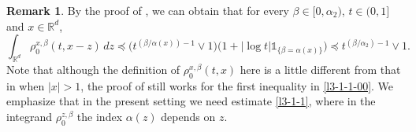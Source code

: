 \documentclass[a4paper,11pt]{amsart}
\newcommand{\R}{\mathds R}
\newcommand{\B}{\beta}
\newcommand{\I}{\mathds 1}
\newcommand{\p}{\preceq}
\newcommand{\A}{\alpha}
\theoremstyle{definition}
\newtheorem{remark}[theorem]{Remark}
\begin{document}
\begin{remark} By the proof of \cite[Lemma 2.1(i)]{CZ}, we can obtain that for every $\beta \in [0,\A_2)$, $t \in (0,1]$ and $x \in \R^d$,
\begin{equation}\label{l3-1-1-00}
\int_{\R^d}\rho_{0}^{x,\beta}(t,x-z)\,dz\p \big(t^{({\beta}/{\A(x)})-1}\vee 1\big)\big(1+|\log t|\I_{\{\B=\A(x)\}}\big)\p t^{({\beta}/{\A_2})-1}\vee 1.
\end{equation}
Note that although the definition of $\rho^{x,\B}_{0}(t,x)$ here is a little
different from that in \cite{CZ} when $|x|>1$, the proof of
\cite[Lemma 2.1]{CZ}  still works  for the first inequality in \eqref{l3-1-1-00}. We emphasize that in the present setting we
need  estimate \eqref{l3-1-1}, where in the integrand
$\rho^{z,\B}_0$ the index $\A(z)$ depends on $z$.
\end{remark}
\end{document}

